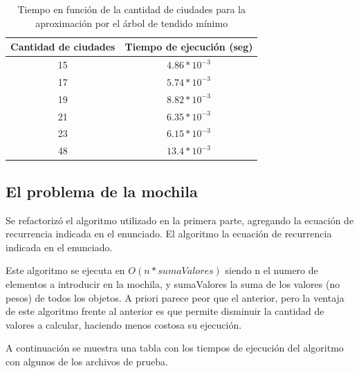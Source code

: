 \documentclass[a4paper,10pt]{article}
\begin{document}
\begin{table}[H]
\centering
\begin{tabular}{|c|c|}
\hline
Cantidad de ciudades	& Tiempo de ejecución (seg)\\\hline
15						& $4.86 * 10^{-3}$\\\hline
17						& $5.74 * 10^{-3}$\\\hline
19						& $8.82 * 10^{-3}$\\\hline
21						& $6.35 * 10^{-3}$\\\hline
23						& $6.15 * 10^{-3}$\\\hline
48						& $13.4 * 10^{-3}$\\\hline
\end{tabular}
\caption{Tiempo en función de la cantidad de ciudades para la aproximación por el árbol de tendido mínimo}
\label{tab:held}
\end{table}

\subsection{El problema de la mochila}

Se refactorizó el algoritmo utilizado en la primera parte, agregando la ecuación de recurrencia indicada en el enunciado. El algoritmo la ecuación de recurrencia indicada en el enunciado.

Este algoritmo se ejecuta en $O(n * sumaValores)$ siendo n el numero de elementos a introducir en la mochila, y sumaValores la suma de los valores (no pesos) de todos los objetos. A priori parece peor que el anterior, pero la ventaja de este algoritmo frente al anterior es que permite disminuir la cantidad de valores a calcular, haciendo menos costosa su ejecución.

A continuación se muestra una tabla con los tiempos de ejecución del algoritmo con algunos de los archivos de prueba.
\end{document}
